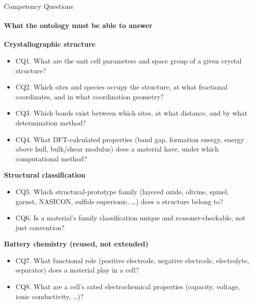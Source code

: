 \documentclass[aspectratio=169, 11pt]{beamer}
\begin{document}
\begin{frame}{Competency Questions}
\framesubtitle{What the ontology must be able to answer}
\footnotesize
\textbf{Crystallographic structure}
\begin{itemize}\itemsep0.15em
    \item CQ1. What are the unit cell parameters and space group of a given crystal structure?
    \item CQ2. Which sites and species occupy the structure, at what fractional coordinates, and in what coordination geometry?
    \item CQ3. Which bonds exist between which sites, at what distance, and by what determination method?
    \item CQ4. What DFT-calculated properties (band gap, formation energy, energy above hull, bulk/shear modulus) does a material have, under which computational method?
\end{itemize}
\vspace{0.2cm}
\textbf{Structural classification}
\begin{itemize}\itemsep0.15em
    \item CQ5. Which structural-prototype family (layered oxide, olivine, spinel, garnet, NASICON, sulfide superionic, \dots) does a structure belong to?
    \item CQ6. Is a material's family classification unique and reasoner-checkable, not just convention?
\end{itemize}
\vspace{0.2cm}
\textbf{Battery chemistry (reused, not extended)}
\begin{itemize}\itemsep0.15em
    \item CQ7. What functional role (positive electrode, negative electrode, electrolyte, separator) does a material play in a cell?
    \item CQ8. What are a cell's rated electrochemical properties (capacity, voltage, ionic conductivity, \dots)?
\end{itemize}
\end{frame}
\end{document}
